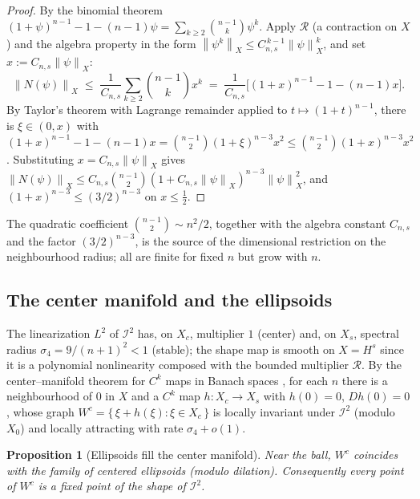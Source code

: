 \documentclass[10pt,a4paper]{amsart}
\newtheorem{proposition}[theorem]{Proposition}
\newcommand{\Rad}{\mathcal{R}}
\newcommand{\IB}{\mathcal{I}}
\newcommand{\norm}[1]{\left\lVert #1 \right\rVert}
\begin{document}
\begin{proof}
By the binomial theorem $(1+\psi)^{n-1}-1-(n-1)\psi=\sum_{k\ge2}\binom{n-1}{k}
\psi^{k}$. Apply $\Rad$ (a contraction on $X$) and the algebra property in the
form $\norm{\psi^k}_X\le C_{n,s}^{\,k-1}\norm\psi_X^k$, and set
$x:=C_{n,s}\norm\psi_X$:
\[
   \norm{N(\psi)}_X
   \;\le\;\frac{1}{C_{n,s}}\sum_{k\ge2}\binom{n-1}{k}x^{k}
   \;=\;\frac{1}{C_{n,s}}\Big[(1+x)^{n-1}-1-(n-1)x\Big].
\]
By Taylor's theorem with Lagrange remainder applied to $t\mapsto(1+t)^{n-1}$,
there is $\xi\in(0,x)$ with
$(1+x)^{n-1}-1-(n-1)x=\binom{n-1}{2}(1+\xi)^{n-3}x^2
\le\binom{n-1}{2}(1+x)^{n-3}x^2$. Substituting $x=C_{n,s}\norm\psi_X$ gives
$\norm{N(\psi)}_X\le C_{n,s}\binom{n-1}{2}(1+C_{n,s}\norm\psi_X)^{n-3}
\norm\psi_X^2$, and $(1+x)^{n-3}\le(3/2)^{n-3}$ on $x\le\tfrac12$.
\end{proof}

The quadratic coefficient $\binom{n-1}{2}\sim n^2/2$, together with the algebra
constant $C_{n,s}$ and the factor $(3/2)^{n-3}$, is the source of the
dimensional restriction on the neighbourhood radius; all are finite for fixed
$n$ but grow with $n$.

\subsection{The center manifold and the ellipsoids}
The linearization $L^2$ of $\IB^2$ has, on $X_c$, multiplier $1$ (center) and,
on $X_s$, spectral radius $\sigma_4=9/(n+1)^2<1$ (stable); the shape map is
smooth on $X=H^s$ since it is a polynomial nonlinearity composed with the
bounded multiplier $\Rad$. By the center--manifold theorem for $C^k$ maps in
Banach spaces \cite{VanderbauwhedeIooss1992,HPS1977}, for each $n$ there is a
neighbourhood of $0$ in $X$ and a $C^k$ map $h:X_c\to X_s$ with $h(0)=0$,
$Dh(0)=0$, whose graph $W^c=\{\,\xi+h(\xi):\xi\in X_c\,\}$ is locally invariant
under $\IB^2$ (modulo $X_0$) and locally attracting with rate $\sigma_4+o(1)$.

\begin{proposition}[Ellipsoids fill the center manifold]\label{prop:center-mfld}
Near the ball, $W^c$ coincides with the family of centered ellipsoids
(modulo dilation). Consequently every point of $W^c$ is a fixed point of the
shape of $\IB^2$.
\end{proposition}
\end{document}
